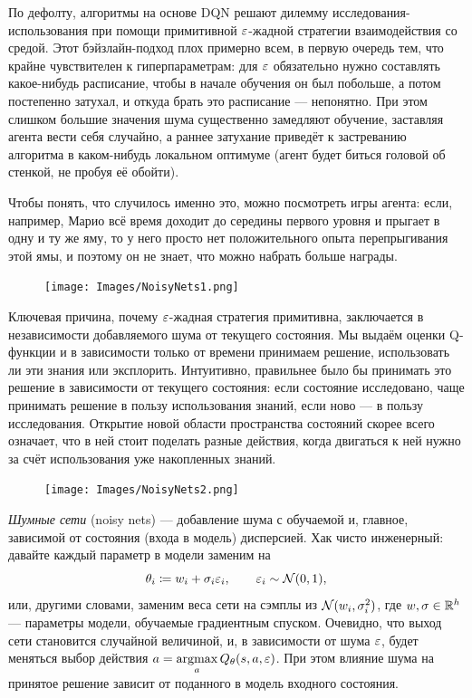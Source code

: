 По дефолту, алгоритмы на основе DQN решают дилемму исследования-использования при помощи примитивной $\varepsilon$-жадной стратегии взаимодействия со средой. Этот бэйзлайн-подход плох примерно всем, в первую очередь тем, что крайне чувствителен к гиперпараметрам: для $\varepsilon$ обязательно нужно составлять какое-нибудь расписание, чтобы в начале обучения он был побольше, а потом постепенно затухал, и откуда брать это расписание --- непонятно. При этом слишком большие значения шума существенно замедляют обучение, заставляя агента вести себя случайно, а раннее затухание приведёт к застреванию алгоритма в каком-нибудь локальном оптимуме (агент будет биться головой об стенкой, не пробуя её обойти). 
\begin{remark}
Чтобы понять, что случилось именно это, можно посмотреть игры агента: если, например, Марио всё время доходит до середины первого уровня и прыгает в одну и ту же яму, то у него просто нет положительного опыта перепрыгивания этой ямы, и поэтому он не знает, что можно набрать больше награды.
\end{remark}

\begin{figure}
\vspace{-0.3cm}
\centering
\texttt{[image: Images/NoisyNets1.png]}
\vspace{-0.3cm}
\end{figure}

Ключевая причина, почему $\varepsilon$-жадная стратегия примитивна, заключается в независимости добавляемого шума от текущего состояния. Мы выдаём оценки Q-функции и в зависимости только от времени принимаем решение, использовать ли эти знания или эксплорить. Интуитивно, правильнее было бы принимать это решение в зависимости от текущего состояния: если состояние исследовано, чаще принимать решение в пользу использования знаний, если ново --- в пользу исследования. Открытие новой области пространства состояний скорее всего означает, что в ней стоит поделать разные действия, когда двигаться к ней нужно за счёт использования уже накопленных знаний.

\begin{figure}
\vspace{-0.3cm}
\centering
\texttt{[image: Images/NoisyNets2.png]}
\vspace{-0.3cm}
\end{figure}

\emph{Шумные сети} (noisy nets) --- добавление шума с обучаемой и, главное, зависимой от состояния (входа в модель) дисперсией. Хак чисто инженерный: давайте каждый параметр в модели заменим на
$$\theta_i \coloneqq w_i + \sigma_i \varepsilon_i, \qquad \varepsilon_i \sim \mathcal{N}(0, 1),$$
или, другими словами, заменим веса сети на сэмплы из $\mathcal{N}(w_i, \sigma^2_i)$, где $w, \sigma \in \mathbb{R}^h$ --- параметры модели, обучаемые градиентным спуском. Очевидно, что выход сети становится случайной величиной, и, в зависимости от шума $\varepsilon$, будет меняться выбор действия $a \HM= \argmax\limits_a Q_{\theta}(s, a, \eps)$. При этом влияние шума на принятое решение зависит от поданного в модель входного состояния.


